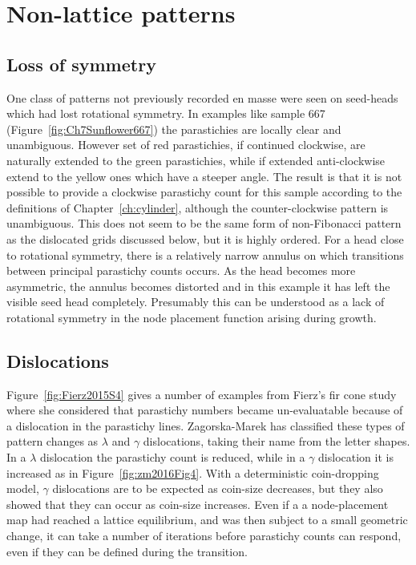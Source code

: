 \clearpage
\section{Non-lattice patterns}
\subsection{Loss of symmetry}
One class of patterns not previously recorded en masse were seen on seed-heads which had lost rotational symmetry. In examples like sample 667 (Figure~\ref{fig:Ch7Sunflower667}) the parastichies are locally clear and unambiguous. However set of red parastichies, if continued clockwise, are naturally extended to the green parastichies, while if extended anti-clockwise extend to the yellow ones which have a steeper angle. The result is that it is not possible to provide a clockwise parastichy count for this sample according to the definitions of Chapter~\ref{ch:cylinder}, although the counter-clockwise pattern is unambiguous. This does not seem to be the same form of non-Fibonacci pattern as the dislocated grids discussed below, but it is highly ordered.
For a head close to rotational symmetry, there is a relatively narrow annulus on which transitions between principal parastichy counts occurs. As the head becomes more asymmetric, the annulus becomes distorted and in this example it has left the visible seed head completely.  Presumably this can be understood as a lack of rotational symmetry in the node placement function arising during growth.


\subsection{Dislocations}
Figure~\ref{fig:Fierz2015S4} gives a number of examples from Fierz's fir cone study where she considered that parastichy numbers became un-evaluatable because of a dislocation in the parastichy lines. 
 Zagorska-Marek has classified  these types of pattern changes as  $\lambda$ and $\gamma$ dislocations, taking their name from the letter shapes. In a $\lambda$ dislocation the parastichy count is reduced, while in a $\gamma$ dislocation it is increased as in Figure~\ref{fig:zm2016Fig4}. With a deterministic coin-dropping model, $\gamma$ dislocations are to be expected as coin-size decreases, but they also showed that they can occur as coin-size increases. 
Even if a a node-placement map had reached a lattice equilibrium, and was then subject to a small geometric change, it can take a number of iterations before parastichy counts can respond, even if they can be defined during the transition. 

